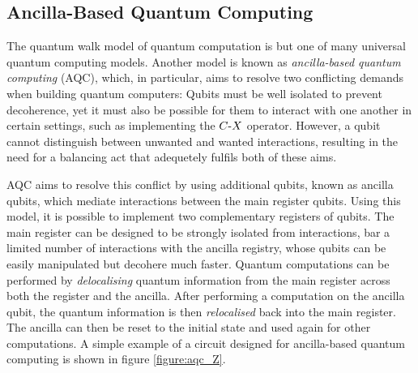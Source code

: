 \subsection{Ancilla-Based Quantum Computing}
The quantum walk model of quantum computation is but one of many universal quantum computing models.
Another model is known as \emph{ancilla-based quantum computing} (AQC), which, in particular, aims to resolve two conflicting demands when building quantum computers:
Qubits must be well isolated to prevent decoherence, yet it must also be possible for them to interact with one another in certain settings, such as implementing the $C\text{-}X$ operator.
However, a qubit cannot distinguish between unwanted and wanted interactions, resulting in the need for a balancing act that adequetely fulfils both of these aims.

AQC aims to resolve this conflict by using additional qubits, known as ancilla qubits, which mediate interactions between the main register qubits. 
Using this model, it is possible to implement two complementary registers of qubits.
The main register can be designed to be strongly isolated from interactions, bar a limited number of interactions with the ancilla registry, whose qubits can be easily manipulated but decohere much faster.
Quantum computations can be performed by \emph{delocalising} quantum information from the main register across both the register and the ancilla.
After performing a computation on the ancilla qubit, the quantum information is then \emph{relocalised} back into the main register.
The ancilla can then be reset to the initial state and used again for other computations.
A simple example of a circuit designed for ancilla-based quantum computing is shown in figure \ref{figure:aqc_Z}. 


